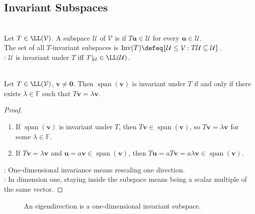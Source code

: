 \subsection{Invariant Subspaces}

\begin{definition} \label{def:invariant-subspace} \\
Let $T\in\LL(\mathcal{V})$. A subspace $\mathcal{U}$ of $\mathcal{V}$ is  if $T\mathbf{u}\in\mathcal{U}$ for every $\mathbf{u}\in\mathcal{U}$.\\
The set of all $T$-invariant subspaces is $\operatorname{Inv}(T)\defeq\{\mathcal{U}\leq\mathcal{V}:T\mathcal{U}\subseteq\mathcal{U}\}$.\\
: $\mathcal{U}$ is invariant under $T$ iff $T|_{\mathcal{U}}\in\LL(\mathcal{U})$.
\end{definition}

\begin{proposition} \label{prop:one-dimensional-invariant-subspaces-and-eigenvectors} \\
Let $T\in\LL(\mathcal{V})$, $\mathbf{v}\neq\mathbf{0}$. Then $\operatorname{span}(\mathbf{v})$ is invariant under $T$ if and only if there exists $\lambda\in\mathbb{F}$ such that $T\mathbf{v}=\lambda\mathbf{v}$.
\begin{proof}
\begin{enumerate}[label=\roman*.]
\setlength{\itemsep}{0pt}
\item[$(\Rightarrow)$] If $\operatorname{span}(\mathbf{v})$ is invariant under $T$, then $T\mathbf{v}\in\operatorname{span}(\mathbf{v})$, so $T\mathbf{v}=\lambda\mathbf{v}$ for some $\lambda\in\mathbb{F}$.
\item[$(\Leftarrow)$] If $T\mathbf{v}=\lambda\mathbf{v}$ and $\mathbf{u}=a\mathbf{v}\in\operatorname{span}(\mathbf{v})$, then $T\mathbf{u}=aT\mathbf{v}=a\lambda\mathbf{v}\in\operatorname{span}(\mathbf{v})$.
\end{enumerate}
: One-dimensional invariance means rescaling one direction.\\
: In dimension one, staying inside the subspace means being a scalar multiple of the same vector.
\end{proof}
\end{proposition}

\begin{figure}[H]
  \centering
  
  \caption{An eigendirection is a one-dimensional invariant subspace.}
  \label{fig:eigenline-scaling}
\end{figure}

